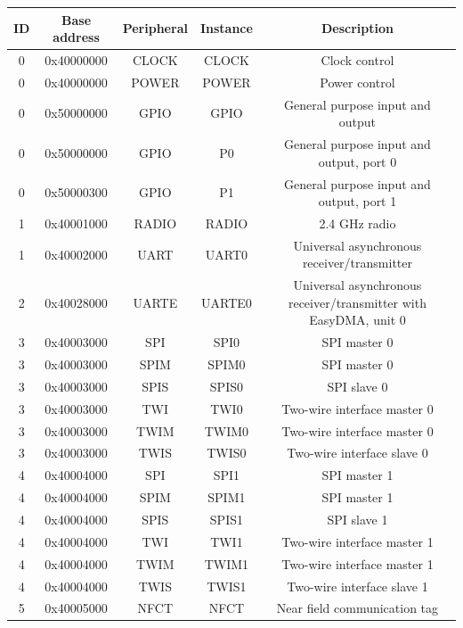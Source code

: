 \begin{table}[H]
    \centering
    \scriptsize
    \begin{tabular}{|c|c|c|c|c|}
        \hline
        \textbf{ID} & \textbf{Base address} & \textbf{Peripheral} & \textbf{Instance} & \textbf{Description} \\
        \hline
        0 & 0x40000000 & CLOCK & CLOCK & Clock control \\
        0 & 0x40000000 & POWER & POWER & Power control \\
        0 & 0x50000000 & GPIO & GPIO & General purpose input and output \\
        0 & 0x50000000 & GPIO & P0 & General purpose input and output, port 0 \\
        0 & 0x50000300 & GPIO & P1 & General purpose input and output, port 1 \\
        1 & 0x40001000 & RADIO & RADIO & 2.4 GHz radio \\
        1 & 0x40002000 & UART & UART0 & Universal asynchronous receiver/transmitter \\
        2 & 0x40028000 & UARTE & UARTE0 & Universal asynchronous receiver/transmitter with EasyDMA, unit 0 \\
        3 & 0x40003000 & SPI & SPI0 & SPI master 0 \\
        3 & 0x40003000 & SPIM & SPIM0 & SPI master 0 \\
        3 & 0x40003000 & SPIS & SPIS0 & SPI slave 0 \\
        3 & 0x40003000 & TWI & TWI0 & Two-wire interface master 0 \\
        3 & 0x40003000 & TWIM & TWIM0 & Two-wire interface master 0 \\
        3 & 0x40003000 & TWIS & TWIS0 & Two-wire interface slave 0 \\
        4 & 0x40004000 & SPI & SPI1 & SPI master 1 \\
        4 & 0x40004000 & SPIM & SPIM1 & SPI master 1 \\
        4 & 0x40004000 & SPIS & SPIS1 & SPI slave 1 \\
        4 & 0x40004000 & TWI & TWI1 & Two-wire interface master 1 \\
        4 & 0x40004000 & TWIM & TWIM1 & Two-wire interface master 1 \\
        4 & 0x40004000 & TWIS & TWIS1 & Two-wire interface slave 1 \\
        5 & 0x40005000 & NFCT & NFCT & Near field communication tag \\

\end{tabular}
\end{table}

